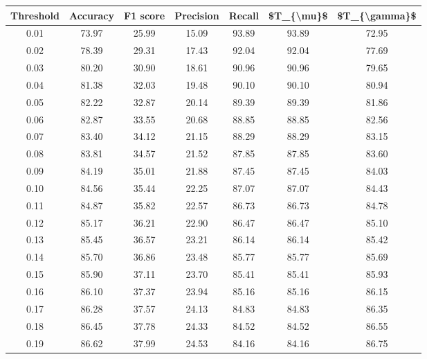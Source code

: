 \begin{tabular}{|c|c|c|c|c|c|c|}
\hline
 Threshold &  Accuracy &  F1 score &  Precision &  Recall &  \$T\_\{\textbackslash mu\}\$ &  \$T\_\{\textbackslash gamma\}\$ \\
\hline
      0.01 &     73.97 &     25.99 &      15.09 &   93.89 &      93.89 &         72.95 \\
      0.02 &     78.39 &     29.31 &      17.43 &   92.04 &      92.04 &         77.69 \\
      0.03 &     80.20 &     30.90 &      18.61 &   90.96 &      90.96 &         79.65 \\
      0.04 &     81.38 &     32.03 &      19.48 &   90.10 &      90.10 &         80.94 \\
      0.05 &     82.22 &     32.87 &      20.14 &   89.39 &      89.39 &         81.86 \\
      0.06 &     82.87 &     33.55 &      20.68 &   88.85 &      88.85 &         82.56 \\
      0.07 &     83.40 &     34.12 &      21.15 &   88.29 &      88.29 &         83.15 \\
      0.08 &     83.81 &     34.57 &      21.52 &   87.85 &      87.85 &         83.60 \\
      0.09 &     84.19 &     35.01 &      21.88 &   87.45 &      87.45 &         84.03 \\
      0.10 &     84.56 &     35.44 &      22.25 &   87.07 &      87.07 &         84.43 \\
      0.11 &     84.87 &     35.82 &      22.57 &   86.73 &      86.73 &         84.78 \\
      0.12 &     85.17 &     36.21 &      22.90 &   86.47 &      86.47 &         85.10 \\
      0.13 &     85.45 &     36.57 &      23.21 &   86.14 &      86.14 &         85.42 \\
      0.14 &     85.70 &     36.86 &      23.48 &   85.77 &      85.77 &         85.69 \\
      0.15 &     85.90 &     37.11 &      23.70 &   85.41 &      85.41 &         85.93 \\
      0.16 &     86.10 &     37.37 &      23.94 &   85.16 &      85.16 &         86.15 \\
      0.17 &     86.28 &     37.57 &      24.13 &   84.83 &      84.83 &         86.35 \\
      0.18 &     86.45 &     37.78 &      24.33 &   84.52 &      84.52 &         86.55 \\
      0.19 &     86.62 &     37.99 &      24.53 &   84.16 &      84.16 &         86.75 \\

\end{tabular}
